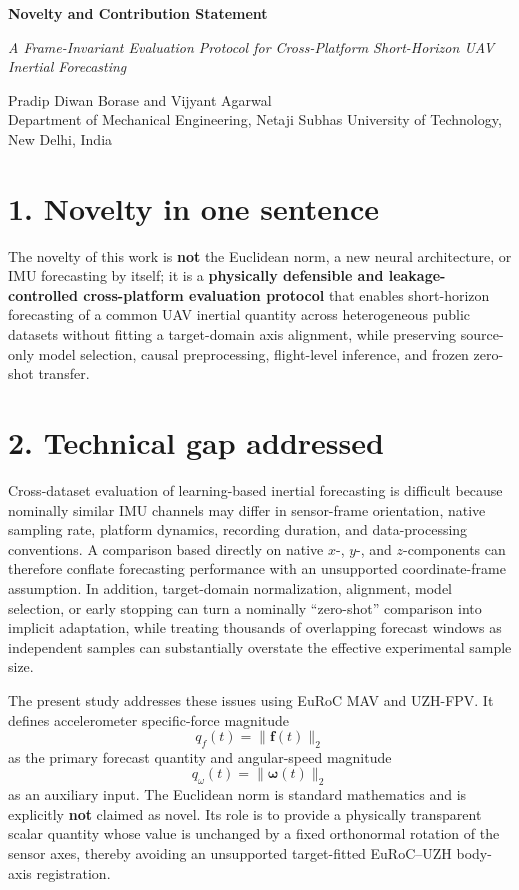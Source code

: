 \documentclass[12pt,a4paper]{article}
\begin{document}
\begin{center}
{\LARGE\bfseries Novelty and Contribution Statement}

\vspace{0.7em}
{\large\itshape A Frame-Invariant Evaluation Protocol for Cross-Platform Short-Horizon UAV Inertial Forecasting}

\vspace{0.4em}
Pradip Diwan Borase and Vijyant Agarwal\\
Department of Mechanical Engineering, Netaji Subhas University of Technology, New Delhi, India
\end{center}

\section*{1. Novelty in one sentence}

The novelty of this work is \textbf{not} the Euclidean norm, a new neural architecture, or IMU forecasting by itself; it is a \textbf{physically defensible and leakage-controlled cross-platform evaluation protocol} that enables short-horizon forecasting of a common UAV inertial quantity across heterogeneous public datasets without fitting a target-domain axis alignment, while preserving source-only model selection, causal preprocessing, flight-level inference, and frozen zero-shot transfer.

\section*{2. Technical gap addressed}

Cross-dataset evaluation of learning-based inertial forecasting is difficult because nominally similar IMU channels may differ in sensor-frame orientation, native sampling rate, platform dynamics, recording duration, and data-processing conventions. A comparison based directly on native $x$-, $y$-, and $z$-components can therefore conflate forecasting performance with an unsupported coordinate-frame assumption. In addition, target-domain normalization, alignment, model selection, or early stopping can turn a nominally ``zero-shot'' comparison into implicit adaptation, while treating thousands of overlapping forecast windows as independent samples can substantially overstate the effective experimental sample size.

The present study addresses these issues using EuRoC MAV and UZH-FPV. It defines accelerometer specific-force magnitude
\[
q_f(t)=\|\mathbf{f}(t)\|_2
\]
as the primary forecast quantity and angular-speed magnitude
\[
q_\omega(t)=\|\boldsymbol{\omega}(t)\|_2
\]
as an auxiliary input. The Euclidean norm is standard mathematics and is explicitly \textbf{not} claimed as novel. Its role is to provide a physically transparent scalar quantity whose value is unchanged by a fixed orthonormal rotation of the sensor axes, thereby avoiding an unsupported target-fitted EuRoC--UZH body-axis registration.
\end{document}

